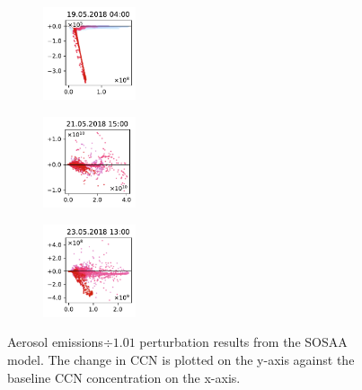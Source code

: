 \begin{figure}[H]
    \begin{subfigure}
        \centering
        \includegraphics[width=0.30\textwidth,valign=t]{evaluation/figures/perturbations/perturbation-19.05.2018:04.00-aerosols-div-1.01.pdf}
    \end{subfigure}
    \begin{subfigure}
        \centering
        \includegraphics[width=0.30\textwidth,valign=t]{evaluation/figures/perturbations/perturbation-21.05.2018:15.00-aerosols-div-1.01.pdf}
    \end{subfigure}
    \begin{subfigure}
        \centering
        \includegraphics[width=0.30\textwidth,valign=t]{evaluation/figures/perturbations/perturbation-23.05.2018:13.00-aerosols-div-1.01.pdf}
    \end{subfigure}

    \caption[Aerosol emissions$\div 1.01$ perturbation SOSAA results]{Aerosol emissions$\div 1.01$ perturbation results from the SOSAA model. The change in CCN is plotted on the y-axis against the baseline CCN concentration on the x-axis.}
    \label{fig:sosaa-perturbation-aerosols-div-1.01}
\end{figure}

